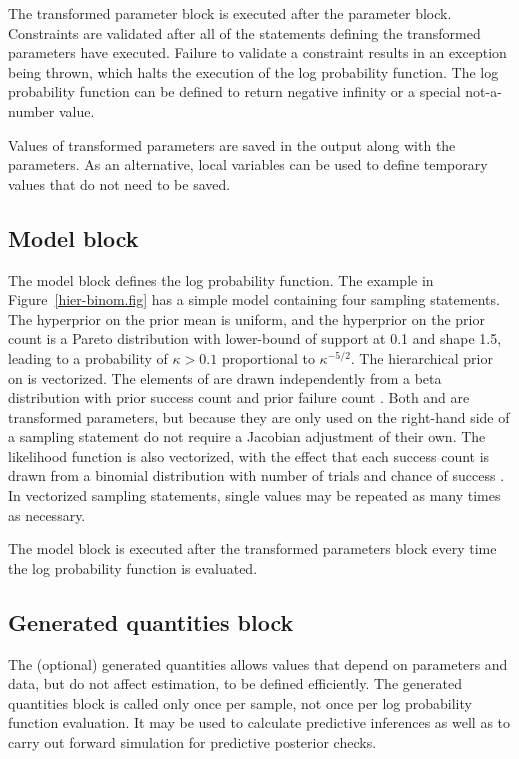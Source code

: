 \documentclass[article]{jss}
\begin{document}
The transformed parameter block is executed after the parameter
block.  Constraints are validated after all of the statements defining the
transformed parameters have executed.  Failure to validate a
constraint results in an exception being thrown, which halts the
execution of the log probability function.  The log probability
function can be defined to return negative infinity or a special
not-a-number value. 

Values of transformed parameters are saved in the output along
with the parameters.  As an alternative, local variables can be used
to define temporary values that do not need to be saved.  

\subsection{Model block}

The model block defines the log probability function.  The example in
Figure~\ref{hier-binom.fig} has a simple model containing four
sampling statements.  The hyperprior on the prior mean 
is uniform, and the hyperprior on the prior count  is a
Pareto distribution with lower-bound of support at 0.1 and shape 1.5,
leading to a probability of $\kappa > 0.1$ proportional to
$\kappa^{-5/2}$.  The hierarchical prior on  is
vectorized.  The elements of  are drawn independently from
a beta distribution with prior success count  and prior
failure count .  Both  and  are
transformed parameters, but because they are only used on the
right-hand side of a sampling statement do not require a Jacobian
adjustment of their own.  The likelihood function is also vectorized,
with the effect that each success count  is drawn from a
binomial distribution with number of trials  and chance of
success .  In vectorized sampling statements, single
values may be repeated as many times as necessary.  

The model block is executed after the transformed parameters block
every time the log probability function is evaluated.  

\subsection{Generated quantities block}

The (optional) generated quantities allows values that depend on
parameters and data, but do not affect estimation, to be defined
efficiently.  The generated quantities block is called only once per
sample, not once per log probability function evaluation.  It may be
used to calculate predictive inferences as well as to carry out
forward simulation for predictive posterior checks.
\end{document}
